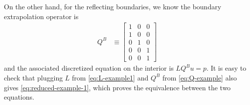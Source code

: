 \documentclass[11pt]{article}
\begin{document}
On the other hand, for the reflecting boundaries, we know the boundary extrapolation operator is
\begin{align}
	Q^B &\equiv \begin{bmatrix}
		1 & 0 & 0\\
		1 & 0 & 0\\
		0 & 1& 0\\
		0 & 0& 1\\
		0 & 0& 1
	\end{bmatrix}\label{eq:Q-example}
\end{align}
and the associated discretized equation on the interior is $LQ^Bu = p$. It is easy to check that plugging $L$ from \cref{eq:L-example1} and $Q^B$ from \cref{eq:Q-example} also gives \cref{eq:reduced-example-1}, which proves the equivalence between the two equations.
\end{document}
